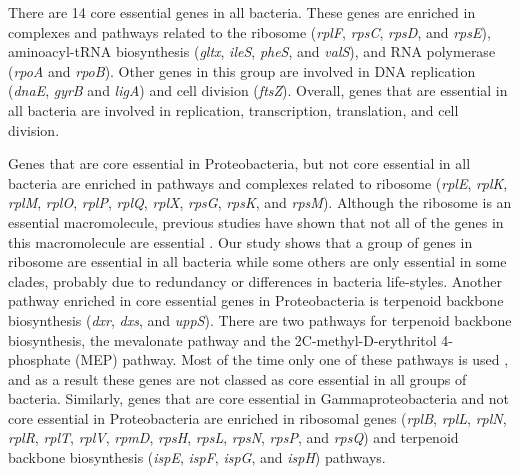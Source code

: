 \documentclass[12pt,letterpaper]{article}
\begin{document}
There are 14 core essential genes in all bacteria. These genes are enriched in complexes and pathways related to the ribosome (\textit{rplF}, \textit{rpsC}, \textit{rpsD}, and \textit{rpsE}), aminoacyl-tRNA biosynthesis (\textit{gltx}, \textit{ileS}, \textit{pheS}, and \textit{valS}), and RNA polymerase (\textit{rpoA} and \textit{rpoB}). Other genes in this group are involved in DNA replication (\textit{dnaE}, \textit{gyrB} and \textit{ligA}) and cell division (\textit{ftsZ}). Overall, genes that are essential in all bacteria are involved in replication, transcription, translation, and cell division.

Genes that are core essential in Proteobacteria, but not core essential in all bacteria are enriched in pathways and complexes related to ribosome (\textit{rplE}, \textit{rplK}, \textit{rplM}, \textit{rplO}, \textit{rplP}, \textit{rplQ}, \textit{rplX}, \textit{rpsG}, \textit{rpsK}, and \textit{rpsM}). Although the ribosome is an essential macromolecule, previous studies have shown that not all of the genes in this macromolecule are essential \cite{shoji_systematic_2011, akanuma_inactivation_2012}. Our study shows that a group of genes in ribosome are essential in all bacteria while some others are only essential in some clades, probably due to redundancy or differences in bacteria life-styles. Another pathway enriched in core essential genes in Proteobacteria is terpenoid backbone biosynthesis (\textit{dxr}, \textit{dxs}, and \textit{uppS}). There are two pathways for terpenoid backbone biosynthesis, the mevalonate pathway and the 2C-methyl-D-erythritol 4-phosphate (MEP) pathway. Most of the time only one of these pathways is used \cite{heuston_isoprenoid_2012}, and as a result these genes are not classed as core essential in all groups of bacteria. Similarly, genes that are core essential in Gammaproteobacteria and not core essential in Proteobacteria are enriched in ribosomal genes (\textit{rplB}, \textit{rplL}, \textit{rplN}, \textit{rplR}, \textit{rplT}, \textit{rplV}, \textit{rpmD}, \textit{rpsH}, \textit{rpsL}, \textit{rpsN}, \textit{rpsP}, and \textit{rpsQ}) and terpenoid backbone biosynthesis (\textit{ispE}, \textit{ispF}, \textit{ispG}, and \textit{ispH}) pathways.
\end{document}
